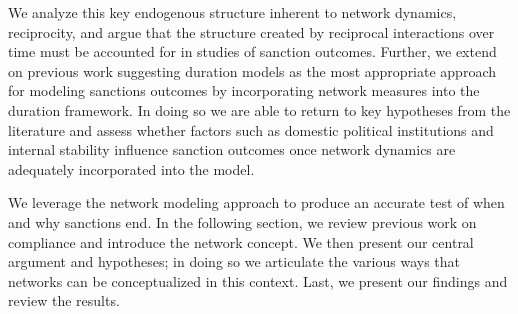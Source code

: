 We analyze this key endogenous structure inherent to network dynamics, reciprocity, and argue that the structure created by reciprocal interactions over time must be accounted for in studies of sanction outcomes. Further, we extend on previous work suggesting duration models as the most appropriate approach for modeling sanctions outcomes by incorporating network measures into the duration framework. In doing so we are able to return to key hypotheses from the literature and assess whether factors such as domestic political institutions and internal stability influence sanction outcomes once network dynamics are adequately incorporated into the model. 

We leverage the network modeling approach to produce an accurate test of when and why sanctions end. In the following section, we review previous work on compliance and introduce the network concept. We then present our central argument and hypotheses; in doing so we articulate the various ways that networks can be conceptualized in this context. Last, we present our findings and review the results.